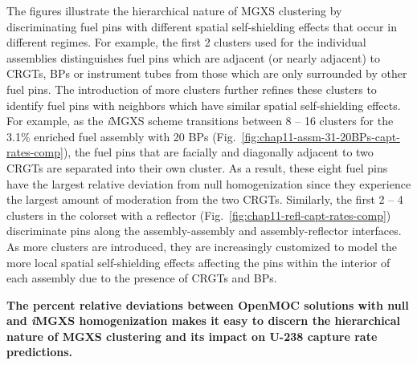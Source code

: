 The figures illustrate the hierarchical nature of \ac{MGXS} clustering by discriminating fuel pins with different spatial self-shielding effects that occur in different regimes. For example, the first 2 clusters used for the individual assemblies distinguishes fuel pins which are adjacent (or nearly adjacent) to \acp{CRGT}, \acp{BP} or instrument tubes from those which are only surrounded by other fuel pins. The introduction of more clusters further refines these clusters to identify fuel pins with neighbors which have similar spatial self-shielding effects. For example, as the \textit{i}\ac{MGXS} scheme transitions between 8 -- 16 clusters for the 3.1\% enriched fuel assembly with 20 \acp{BP} (Fig.~\ref{fig:chap11-assm-31-20BPs-capt-rates-comp}), the fuel pins that are facially and diagonally adjacent to two \acp{CRGT} are separated into their own cluster. As a result, these eight fuel pins have the largest relative deviation from null homogenization since they experience the largest amount of moderation from the two \acp{CRGT}. Similarly, the first 2 -- 4 clusters in the colorset with a reflector (Fig.~\ref{fig:chap11-refl-capt-rates-comp}) discriminate pins along the assembly-assembly and assembly-reflector interfaces. As more clusters are introduced, they are increasingly customized to model the more local spatial self-shielding effects affecting the pins within the interior of each assembly due to the presence of \acp{CRGT} and \acp{BP}.


\begin{emphbox}
\textbf{The percent relative deviations between OpenMOC solutions with null and \textit{i}\ac{MGXS} homogenization makes it easy to discern the hierarchical nature of \ac{MGXS} clustering and its impact on U-238 capture rate predictions.}
\end{emphbox}



